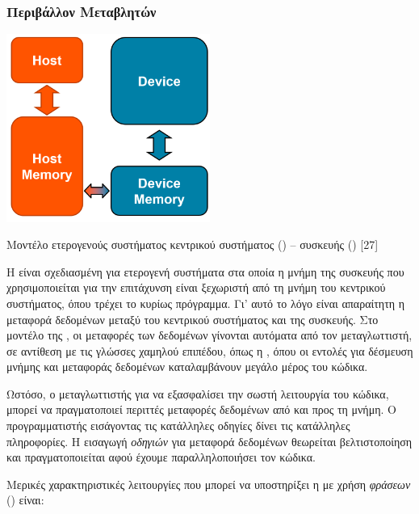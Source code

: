 \subsubsection{Περιβάλλον Μεταβλητών}
 
\begin{Illustration}[!h] 
	\centering
	\includegraphics[width=0.5\textwidth]{images/image058.png} 
	\caption{Μοντέλο ετερογενούς συστήματος κεντρικού συστήματος () – συσκευής () [27]}
	\label{image-3.15}
\end{Illustration}


H  είναι σχεδιασμένη για ετερογενή συστήματα στα οποία η μνήμη της συσκευής που χρησιμοποιείται για την επιτάχυνση είναι ξεχωριστή από τη μνήμη του κεντρικού συστήματος, όπου τρέχει το κυρίως πρόγραμμα. Γι’ αυτό το λόγο είναι απαραίτητη η μεταφορά δεδομένων μεταξύ του κεντρικού συστήματος και της συσκευής. Στο μοντέλο της , οι μεταφορές των δεδομένων γίνονται αυτόματα από τον μεταγλωττιστή, σε αντίθεση με τις γλώσσες χαμηλού επιπέδου, όπως η , όπου οι εντολές για δέσμευση μνήμης και μεταφοράς δεδομένων καταλαμβάνουν μεγάλο μέρος του κώδικα. 

Ωστόσο, ο μεταγλωττιστής για να εξασφαλίσει την σωστή λειτουργία του κώδικα, μπορεί να πραγματοποιεί περιττές μεταφορές δεδομένων από και προς τη μνήμη. Ο προγραμματιστής εισάγοντας τις κατάλληλες οδηγίες δίνει τις κατάλληλες πληροφορίες. Η εισαγωγή \textit{οδηγιών} για μεταφορά δεδομένων θεωρείται βελτιστοποίηση και πραγματοποιείται αφού έχουμε παραλληλοποιήσει τον κώδικα. 

Μερικές χαρακτηριστικές λειτουργίες που μπορεί να υποστηρίξει η  με χρήση \textit{φράσεων} () είναι: 


